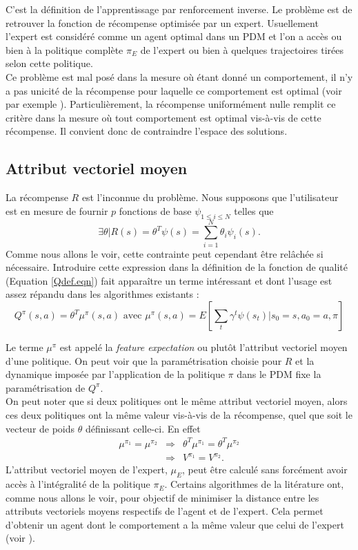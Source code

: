 \documentclass[publibook-draft]{CAp2012}
\begin{document}
C'est la définition de l'apprentissage par renforcement inverse. Le problème est de retrouver la fonction de récompense optimisée par un expert. Usuellement l'expert est considéré comme un agent optimal dans un PDM et l'on a accès ou bien à la politique complète $\pi_E$ de l'expert ou bien à quelques trajectoires tirées selon cette politique.\\

Ce problème est mal posé dans la mesure où étant donné un comportement, il n'y a pas unicité de la récompense pour laquelle ce comportement est optimal (voir par exemple \cite{ng1999policy}). Particulièrement, la récompense uniformément nulle remplit ce critère dans la mesure où tout comportement est optimal vis-à-vis de cette récompense. Il convient donc de contraindre l'espace des solutions.
\subsection{Attribut vectoriel moyen}
\label{ConsiderationsTechniques.sec}
La récompense $R$ est l'inconnue du problème. Nous supposons que l'utilisateur est en mesure de fournir $p$ fonctions de base $\psi_{1\leq i \leq N}$ telles que
\begin{equation}
\label{hatRdef.eqn}
\exists \theta | R(s) = \theta^T\psi(s) = \sum_{i=1}^N\theta_i\psi_i(s).
\end{equation}
Comme nous allons le voir, cette contrainte peut cependant être relâchée si nécessaire. Introduire cette expression dans la définition de la fonction de qualité (Equation \eqref{Qdef.eqn}) fait apparaître un terme intéressant et dont l'usage est assez répandu dans les algorithmes existants :
\begin{equation}
Q^\pi(s,a) = \theta^T\mu^\pi(s,a) \textrm{ avec } \mu^\pi(s,a) = E[\sum_t\gamma^t\psi(s_t)|s_0=s,a_0=a,\pi]
\label{Qmu.eqn}
\end{equation}

Le terme $\mu^\pi$ est appelé la {\it feature expectation} ou plutôt l'attribut vectoriel moyen d'une politique. On peut voir que la paramétrisation choisie pour $R$ et la dynamique imposée par l'application de la politique $\pi$ dans le PDM fixe la paramétrisation de $Q^\pi$.\\

On peut noter que si deux politiques ont le même attribut vectoriel moyen, alors ces deux politiques ont la même valeur vis-à-vis de la récompense, quel que soit le vecteur de poids $\theta$ définissant celle-ci. En effet
\begin{eqnarray}
\mu^{\pi_1} = \mu^{\pi_2} &\Rightarrow& \theta^T\mu^{\pi_1} = \theta^T\mu^{\pi_2}\\
& \Rightarrow& V^{\pi_1} = V^{\pi_2}.
\label{memevaleur.eqn}
\end{eqnarray}
L'attribut vectoriel moyen de l'expert, $\mu_E$, peut être calculé sans forcément avoir accès à l'intégralité de la politique $\pi_E$. Certains algorithmes de la litérature ont, comme nous allons le voir, pour objectif de minimiser la distance entre les attributs vectoriels moyens respectifs de l'agent et de l'expert. Cela permet d'obtenir un agent dont le comportement a la même valeur que celui de l'expert (voir \cite{neu2009training}).
\end{document}
